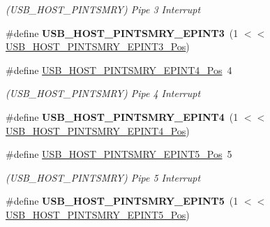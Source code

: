 \begin{DoxyCompactItemize}
\begin{DoxyCompactList}\small\item\em (U\+S\+B\+\_\+\+H\+O\+S\+T\+\_\+\+P\+I\+N\+T\+S\+M\+R\+Y) Pipe 3 Interrupt \end{DoxyCompactList}\item 
\hypertarget{group___s_a_m_l21___u_s_b_ga80ce37d5ecd9bdca5889552b01f7ef1c}{}\#define {\bfseries U\+S\+B\+\_\+\+H\+O\+S\+T\+\_\+\+P\+I\+N\+T\+S\+M\+R\+Y\+\_\+\+E\+P\+I\+N\+T3}~(1 $<$$<$ \hyperlink{group___s_a_m_l21___u_s_b_ga00aacb23160ff0d107bee920b6fcba8c}{U\+S\+B\+\_\+\+H\+O\+S\+T\+\_\+\+P\+I\+N\+T\+S\+M\+R\+Y\+\_\+\+E\+P\+I\+N\+T3\+\_\+\+Pos})\label{group___s_a_m_l21___u_s_b_ga80ce37d5ecd9bdca5889552b01f7ef1c}

\item 
\hypertarget{group___s_a_m_l21___u_s_b_ga31e19abf3c6772e81ce5bb2a507d07c8}{}\#define \hyperlink{group___s_a_m_l21___u_s_b_ga31e19abf3c6772e81ce5bb2a507d07c8}{U\+S\+B\+\_\+\+H\+O\+S\+T\+\_\+\+P\+I\+N\+T\+S\+M\+R\+Y\+\_\+\+E\+P\+I\+N\+T4\+\_\+\+Pos}~4\label{group___s_a_m_l21___u_s_b_ga31e19abf3c6772e81ce5bb2a507d07c8}

\begin{DoxyCompactList}\small\item\em (U\+S\+B\+\_\+\+H\+O\+S\+T\+\_\+\+P\+I\+N\+T\+S\+M\+R\+Y) Pipe 4 Interrupt \end{DoxyCompactList}\item 
\hypertarget{group___s_a_m_l21___u_s_b_ga0053b0b9e615da2bcf1e2758222354c7}{}\#define {\bfseries U\+S\+B\+\_\+\+H\+O\+S\+T\+\_\+\+P\+I\+N\+T\+S\+M\+R\+Y\+\_\+\+E\+P\+I\+N\+T4}~(1 $<$$<$ \hyperlink{group___s_a_m_l21___u_s_b_ga31e19abf3c6772e81ce5bb2a507d07c8}{U\+S\+B\+\_\+\+H\+O\+S\+T\+\_\+\+P\+I\+N\+T\+S\+M\+R\+Y\+\_\+\+E\+P\+I\+N\+T4\+\_\+\+Pos})\label{group___s_a_m_l21___u_s_b_ga0053b0b9e615da2bcf1e2758222354c7}

\item 
\hypertarget{group___s_a_m_l21___u_s_b_ga0107fb520599781e8f7ffcc5f0a09fad}{}\#define \hyperlink{group___s_a_m_l21___u_s_b_ga0107fb520599781e8f7ffcc5f0a09fad}{U\+S\+B\+\_\+\+H\+O\+S\+T\+\_\+\+P\+I\+N\+T\+S\+M\+R\+Y\+\_\+\+E\+P\+I\+N\+T5\+\_\+\+Pos}~5\label{group___s_a_m_l21___u_s_b_ga0107fb520599781e8f7ffcc5f0a09fad}

\begin{DoxyCompactList}\small\item\em (U\+S\+B\+\_\+\+H\+O\+S\+T\+\_\+\+P\+I\+N\+T\+S\+M\+R\+Y) Pipe 5 Interrupt \end{DoxyCompactList}\item 
\hypertarget{group___s_a_m_l21___u_s_b_ga68585c86a0e241af17ba7cdf87306cb9}{}\#define {\bfseries U\+S\+B\+\_\+\+H\+O\+S\+T\+\_\+\+P\+I\+N\+T\+S\+M\+R\+Y\+\_\+\+E\+P\+I\+N\+T5}~(1 $<$$<$ \hyperlink{group___s_a_m_l21___u_s_b_ga0107fb520599781e8f7ffcc5f0a09fad}{U\+S\+B\+\_\+\+H\+O\+S\+T\+\_\+\+P\+I\+N\+T\+S\+M\+R\+Y\+\_\+\+E\+P\+I\+N\+T5\+\_\+\+Pos})\label{group___s_a_m_l21___u_s_b_ga68585c86a0e241af17ba7cdf87306cb9}


\end{DoxyCompactItemize}
